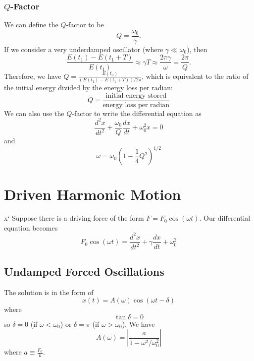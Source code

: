 \documentclass{article}
\begin{document}
\subsubsection{$Q$-Factor}
We can define the $Q$-factor to be 
\begin{equation}
    \boxed{Q = \frac{\omega_0}{\gamma}}.
\end{equation}
If we consider a very underdamped oscillator (where $\gamma \ll \omega_0$), then 
\begin{equation}
    \frac{E(t_1)-E(t_1+T)}{E(t_1)} \approx \gamma T \approx \frac{2\pi \gamma}{\omega} = \frac{2\pi}{Q}.
\end{equation}
Therefore, we have $Q = \frac{E(t_0)}{(E(t_1)-E(t_1+T))/2\pi}$, which is equivalent to the ratio of the initial energy divided by the energy loss per radian: 
\begin{equation}
    \boxed{Q = \frac{\text{initial energy stored}}{\text{energy loss per radian}}}
\end{equation}
We can also use the $Q$-factor to write the differential equation as 
\begin{equation}
    \frac{d^2x}{dt^2}+\frac{\omega_0}{Q}\frac{dx}{dt}+\omega_0^2 x = 0
\end{equation}
and 
\begin{equation}
    \omega = \omega_0\left(1-\frac{1}{4}Q^2\right)^{1/2}
\end{equation}
\newpage
\section{Driven Harmonic Motion}x`
Suppose there is a driving force of the form $F=F_0\cos(\omega t).$ Our differential equation becomes 
\begin{equation}
    F_0\cos(\omega t) = \frac{d^2x}{dt^2}+\gamma \frac{dx}{dt} + \omega_0^2 
\end{equation}
\subsection{Undamped Forced Oscillations}
The solution is in the form of 
\begin{equation}
    x(t) = A(\omega )\cos(\omega t - \delta)
\end{equation}
where 
\begin{equation}
    \tan\delta = 0
\end{equation}
so $\delta = 0$ (if $\omega < \omega_0$) or $\delta = \pi$ (if $\omega > \omega_0$). We have
\begin{equation}
    A(\omega) = \left|\frac{a}{1-\omega^2/\omega_0^2}\right|
\end{equation}
where $a \equiv \frac{F_0}{k}.$
\end{document}
